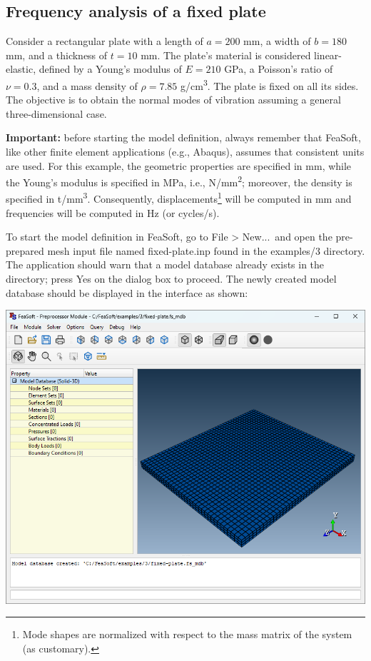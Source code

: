 \documentclass[
    11pt,        %
    a4paper,     %
    final,       %
    fleqn,       %
    notitlepage, %
    onecolumn,   %
    oneside,     %
]{article}
\begin{document}
\subsection{Frequency analysis of a fixed plate}

Consider a rectangular plate with a length of $a = 200$ mm, a width of $b = 180$ mm, and a thickness of $t = 10$ mm. The plate's material is considered linear-elastic, defined by a Young's modulus of $E = 210$ GPa, a Poisson's ratio of $\nu = 0.3$, and a mass density of $\rho = 7.85$ g/cm\textsuperscript{3}. The plate is fixed on all its sides. The objective is to obtain the normal modes of vibration assuming a general three-dimensional case.

\textbf{Important:} before starting the model definition, always remember that FeaSoft, like other finite element applications (e.g., Abaqus), assumes that consistent units are used. For this example, the geometric properties are specified in mm, while the Young's modulus is specified in MPa, i.e., N/mm\textsuperscript{2}; moreover, the density is specified in t/mm\textsuperscript{3}. Consequently, displacements\footnote{Mode shapes are normalized with respect to the mass matrix of the system (as customary).} will be computed in mm and frequencies will be computed in Hz (or cycles/s).

To start the model definition in FeaSoft, go to File > New...\ and open the pre-prepared mesh input file named fixed-plate.inp found in the examples/3 directory. The application should warn that a model database already exists in the directory; press Yes on the dialog box to proceed. The newly created model database should be displayed in the interface as shown:
\begin{center}
    \includegraphics[scale=0.5]{fig/ui-3-1.png}
\end{center}
\end{document}
